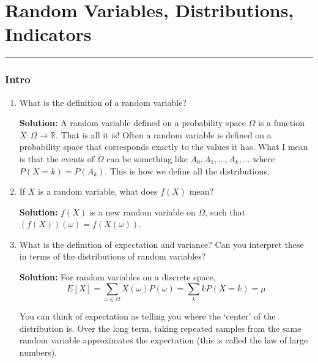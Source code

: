\documentclass{article}
\newenvironment{solution}{

            \color{blue} \smallskip \textbf{Solution:}}{}
\begin{document}
    
    \part*{Random Variables, Distributions, Indicators}
    \vspace{-7pt}
    \hrule
    \vspace{7pt}
    \section{Intro}
    \begin{enumerate}
        \item What is the definition of a random variable?
        \begin{solution}
            A random variable defined on a probability space $\Omega$ is a function $X \colon \Omega \rightarrow \mathbb{R}$. That is all it is!
            Often a random variable is defined on a probability space that corresponds exactly to the values it has. What I mean is that the events of
            $\Omega$ can be something like $A_0, A_1, \ldots, A_k, \ldots$ where $P(X = k) = P(A_k)$. This is how we define all the distributions.
        \end{solution}
        \item If $X$ is a random variable, what does $f(X)$ mean?
        \begin{solution}
            $f(X)$ is a new random variable on $\Omega$, such that $(f(X))(\omega) = f(X(\omega))$.
        \end{solution}
        \item What is the definition of expectation and variance? Can you interpret these in terms of the distributions of random variables?
        \begin{solution}
            For random variables on a discrete space, \[
                E[X] = \sum_{\omega \in \Omega} X(\omega) P(\omega) = \sum_{k} k P(X = k) = \mu
            \]

            You can think of expectation as telling you where the `center' of the distribution is. Over the long term, taking repeated samples from the same
            random variable approximates the expectation (this is called the law of large numbers).


\end{solution}
\end{enumerate}
\end{document}
